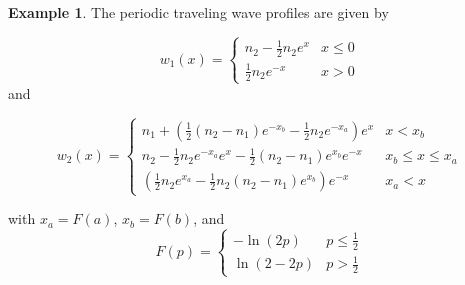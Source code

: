 \documentclass[11pt]{article}
\theoremstyle{definition}
\newtheorem{ex}[thm]{Example}
\numberwithin{equation}{section}
\numberwithin{thm}{section}
\renewcommand{\a}{a}
\renewcommand{\b}{b}
\newcommand{\m}{n_1}
\newcommand{\mtwo}{n_2}
\begin{document}
\begin{ex}
The periodic traveling wave profiles are given by

\begin{equation} \label{w1laplace}
w_1(x) =   \begin{cases} 
n_2 - \frac{1}{2} n_2 e^{x} & x \leq 0 \\
\frac{1}{2} n_2 e^{-x} & x > 0
\end{cases}
\end{equation}
and

\begin{equation} \label{w2laplace}
w_2(x) = \begin{cases}
\m + \left( \frac{1}{2}(\mtwo-\m)e^{-x_\b} - \frac{1}{2}\mtwo e^{-x_\a} \right) e^x & x < x_\b \\
\mtwo - \frac{1}{2} \mtwo e^{-x_\a} e^x - \frac{1}{2} (\mtwo-\m) e^{x_\b}   e^{-x} & x_\b \leq x \leq x_\a \\
\left( \frac{1}{2} \mtwo e^{x_\a} - \frac{1}{2}\mtwo(\mtwo-\m) e^{x_\b} \right) e^{-x} & x_\a < x 
\end{cases} \end{equation}

with $x_a = F(a)$, $x_b=F(b)$, and
\begin{equation}
F(p) = \begin{cases} -\ln(2p) &p \leq \frac{1}{2} \\ \ln(2-2p) & p > \frac{1}{2} \end{cases}
\end{equation}


\end{ex}
\end{document}
